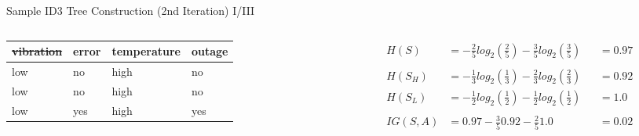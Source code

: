 \documentclass[document.tex]{subfiles}
\begin{document}
\begin{frame}{Sample ID3 Tree Construction (2nd Iteration) I/III}
\begin{columns}
\begin{column}{0.4\textwidth}
\begin{table}
{\begin{tabular}{llll}
                            \toprule
                            \textbf{\sout{vibration}} & \textbf{error} & \textbf{temperature} & \textbf{outage} \\
                            \midrule
                            \rowcolor{LightRed}
                            low &    no &        high &     no \\
                            \rowcolor{LightRed}
                            low &    no &        high &     no \\
                            \rowcolor{LightGreen}
                            low &   yes &        high &    yes \\
                            \bottomrule
                        \end{tabular}
                    }
                \end{table}
                \vspace*{-6mm}
                \begin{table}
                    \caption*{\footnotesize Attribute $A=TEMPERATURE$, Sample $S_L$ \normalsize}
                    \vspace*{-2mm}
                \end{table}
            \end{column}
            \begin{column}{0.6\textwidth}
                \begin{alignat*}{3}
                    H(S) &= -\frac{2}{5}log_2(\frac{2}{5}) - \frac{3}{5}log_2(\frac{3}{5}) &&= 0.97 \\\\
                    H(S_H) &= -\frac{1}{3}log_2(\frac{1}{3}) - \frac{2}{3}log_2(\frac{2}{3}) &&= 0.92 \\
                    H(S_L) &= -\frac{1}{2}log_2(\frac{1}{2}) - \frac{1}{2}log_2(\frac{1}{2}) &&= 1.0 \\\\
                    IG(S, A) &= 0.97 - \frac{3}{5} 0.92 - \frac{2}{5} 1.0 &&= 0.02
                \end{alignat*}
            \end{column}
        \end{columns}
    \end{frame}
    
\end{document}
